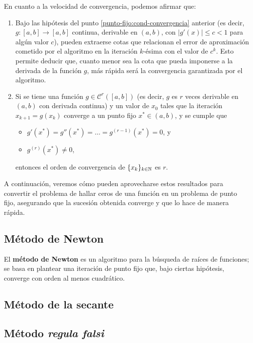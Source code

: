 En cuanto a la velocidad de convergencia, podemos afirmar que:

\begin{enumerate}[label=(\roman*),resume]
\item Bajo las hipótesis del punto \ref{punto-fijo:cond-convergencia}
    anterior (es decir, $g:[a,b] \to [a,b]$ continua, derivable en $(a,b)$,
    con $\lvert g'(x) \rvert \leq c < 1$ para algún valor $c$), pueden
    extraerse cotas que relacionan el error de aproximación cometido por el
    algoritmo en la iteración $k$-ésima con el valor de $c^k$. Esto permite
    deducir que, cuanto menor sea la cota que pueda imponerse a la derivada de
    la función $g$, más rápida será la convergencia garantizada por el
    algoritmo.

\item Si se tiene una función $g \in \mathcal{C}^r([a,b])$ (es decir, $g$ es
    $r$ veces derivable en $(a,b)$ con derivada continua) y un valor de $x_0$
    tales que la iteración $x_{k+1} = g(x_k)$ converge a un punto fijo $x^\ast
    \in (a,b)$, y se cumple que
    \begin{itemize}
    \item $g'(x^\ast) = g''(x^\ast) = \dots = g^{(r-1)}(x^\ast) = 0$, y
    \item $g^{(r)}(x^\ast) \neq 0$,
    \end{itemize}
    entonces el orden de convergencia de $\lbrace x_k \rbrace_{k \in \mathbb{N}}$
    es $r$.
\end{enumerate}

A continuación, veremos cómo pueden aprovecharse estos resultados para
convertir el problema de hallar ceros de una función en un problema de punto
fijo, asegurando que la sucesión obtenida converge y que lo hace de manera
rápida.

\subsection{Método de Newton}

El \textbf{método de Newton} es un algoritmo para la búsqueda de raíces de
funciones; se basa en plantear una iteración de punto fijo que, bajo ciertas
hipótesis, converge con orden al menos cuadrático.




\subsection{Método de la secante}
\subsection{Método \emph{regula falsi}}
